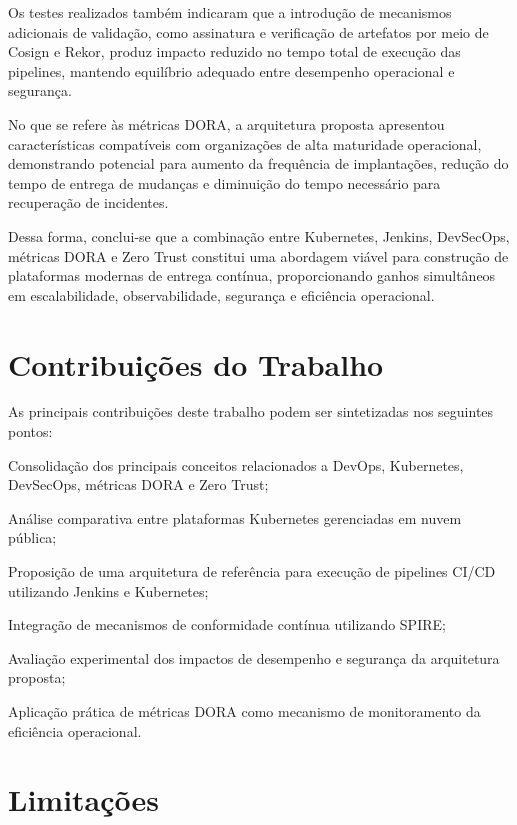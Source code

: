 Os testes realizados também indicaram que a introdução de mecanismos adicionais de validação, como assinatura e verificação de artefatos por meio de Cosign e Rekor, produz impacto reduzido no tempo total de execução das pipelines, mantendo equilíbrio adequado entre desempenho operacional e segurança.

No que se refere às métricas DORA, a arquitetura proposta apresentou características compatíveis com organizações de alta maturidade operacional, demonstrando potencial para aumento da frequência de implantações, redução do tempo de entrega de mudanças e diminuição do tempo necessário para recuperação de incidentes.

Dessa forma, conclui-se que a combinação entre Kubernetes, Jenkins, DevSecOps, métricas DORA e Zero Trust constitui uma abordagem viável para construção de plataformas modernas de entrega contínua, proporcionando ganhos simultâneos em escalabilidade, observabilidade, segurança e eficiência operacional.

\section{Contribuições do Trabalho}
\label{sec:contribuicoes}

As principais contribuições deste trabalho podem ser sintetizadas nos seguintes pontos:

\begin{alineas}
    \item Consolidação dos principais conceitos relacionados a DevOps, Kubernetes, DevSecOps, métricas DORA e Zero Trust;
    \item Análise comparativa entre plataformas Kubernetes gerenciadas em nuvem pública;
    \item Proposição de uma arquitetura de referência para execução de pipelines CI/CD utilizando Jenkins e Kubernetes;
    \item Integração de mecanismos de conformidade contínua utilizando SPIRE;
    \item Avaliação experimental dos impactos de desempenho e segurança da arquitetura proposta;
    \item Aplicação prática de métricas DORA como mecanismo de monitoramento da eficiência operacional.
\end{alineas}

\section{Limitações}
\label{sec:limitacoes}

